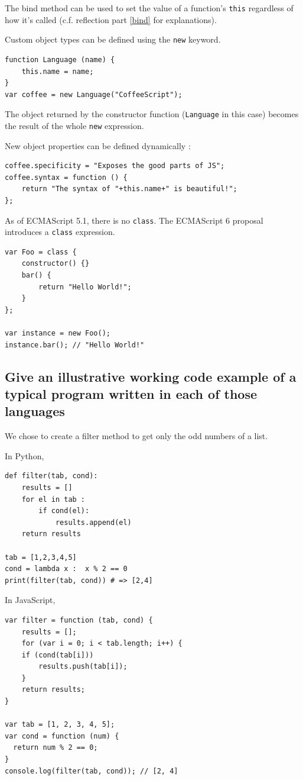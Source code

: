\documentclass[a4paper,10pt]{article}
\begin{document}
The bind method can be used to set the value of a function's \lstinline|this| regardless of how it's called (c.f. reflection part \ref{bind} for explanations).

Custom object types can be defined using the \lstinline|new| keyword.
\begin{lstlisting}
function Language (name) {
    this.name = name;
}
var coffee = new Language("CoffeeScript");
\end{lstlisting}
The object returned by the constructor function (\lstinline|Language| in this case) becomes the result of the whole \lstinline|new| expression.

New object properties can be defined dynamically :
\begin{lstlisting}
coffee.specificity = "Exposes the good parts of JS";
coffee.syntax = function () {
    return "The syntax of "+this.name+" is beautiful!";
};
\end{lstlisting}


As of ECMAScript 5.1, there is no \lstinline|class|.
The ECMAScript 6 proposal introduces a \lstinline|class| expression.

\begin{lstlisting}
var Foo = class {
	constructor() {}
	bar() {
		return "Hello World!";
	}
};

var instance = new Foo();
instance.bar(); // "Hello World!"
\end{lstlisting}


\subsection{Give an illustrative working code example of a typical program written in each of those languages}
We chose to create a filter method to get only the odd numbers of a list.

In Python,
\setpy
\begin{lstlisting}
def filter(tab, cond):
    results = []
    for el in tab :
        if cond(el):
            results.append(el)
    return results

tab = [1,2,3,4,5]
cond = lambda x :  x % 2 == 0
print(filter(tab, cond)) # => [2,4]
\end{lstlisting}

In JavaScript,
\setjs
\begin{lstlisting}
var filter = function (tab, cond) {
	results = [];
	for (var i = 0; i < tab.length; i++) {
	if (cond(tab[i]))
		results.push(tab[i]);
	}
	return results;
}

var tab = [1, 2, 3, 4, 5];
var cond = function (num) {
  return num % 2 == 0;
}
console.log(filter(tab, cond)); // [2, 4]
\end{lstlisting}
\end{document}
